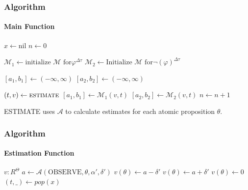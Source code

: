 \documentclass{beamer}
\newcommand{\M}{\mathcal{M}}
\newcommand{\A}{\mathcal{A}}
\begin{document}
\begin{frame}
    \frametitle{Algorithm}
    \framesubtitle{Main Function}
        \begin{algorithmic}
            \State $x \gets \text{nil}$ 
            \State $n \gets 0$ 

                \State $\M_1 \gets \text{initialize $\M$ for} \varphi^{\Delta\tau}$
                \State $\M_2 \gets \text{Initialize $\M$ for} \neg(\varphi)^{\Delta\tau}$

                \State $[a_1, b_1] \gets (-\infty, \infty)$
                \State $[a_2, b_2] \gets (-\infty, \infty)$

                    \State $(t,v) \gets \Call{estimate}{}$
                    \State $[a_1, b_1] \gets \M_1(v, t)$
                    \State $[a_2, b_2] \gets \M_2(v, t)$
                    \State $n \gets n+1$
                \EndWhile
            \EndFunction
            \EndIf
            \EndIf
            \State {}
        \end{algorithmic}
\end{frame}

\begin{frame}
    ESTIMATE uses $\A$ to calculate estimates for each atomic proposition
    $\theta$.
    \frametitle{Algorithm}
    \framesubtitle{Estimation Function}
        \begin{algorithmic}
            \State $v : R^{\Theta}$
            \ForAll{$\theta \in \Theta$}
                \State $a \gets \A(\text{OBSERVE}, \theta, \alpha', \delta')$
                    \State $v(\theta) \gets a - \delta'$
                    \State $v(\theta) \gets a + \delta'$
                \Else
                    \State $v(\theta) \gets 0$
                \EndIf
            \EndFor
            \State $(t,\_) \gets \textit{pop}(x)$
            \State {}
            \EndFunction
        \end{algorithmic}
\end{frame}
\end{document}
